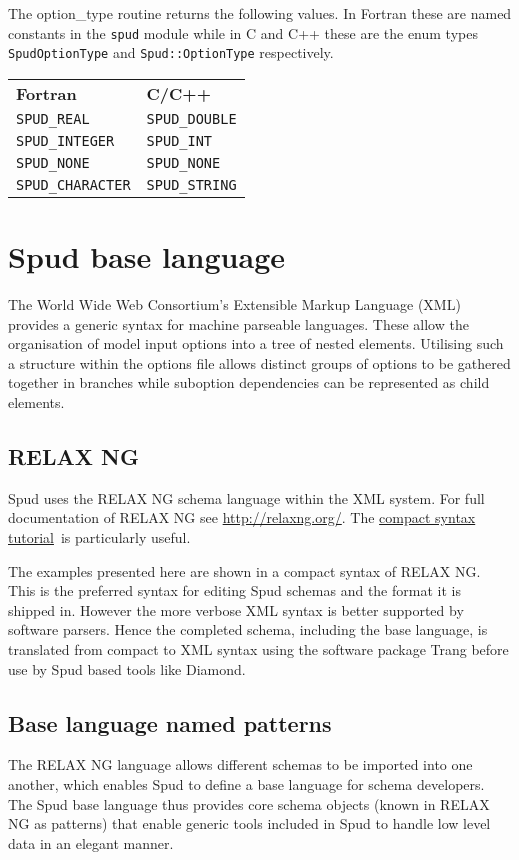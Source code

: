\documentclass[a4paper, 11pt]{book}
\begin{document}
The option\_type routine returns the following values. In Fortran these are
named constants in the \lstinline+spud+ module while in C and C++ these are
the enum types \lstinline+SpudOptionType+ and \lstinline+Spud::OptionType+
respectively. 

\begin{tabular}{ll}
  \textbf{Fortran} & \textbf{C/C++} \\
  \lstinline+SPUD_REAL+ & \lstinline+SPUD_DOUBLE+\\
  \lstinline+SPUD_INTEGER+ & \lstinline+SPUD_INT+\\
  \lstinline+SPUD_NONE+ & \lstinline+SPUD_NONE+\\
  \lstinline+SPUD_CHARACTER+ & \lstinline+SPUD_STRING+
\end{tabular}

\chapter{Spud base language}
\lstset{language=rnc}

The World Wide Web Consortium's Extensible Markup Language (XML) provides a
generic syntax for machine parseable languages.  These allow the
organisation of model input options into a tree of nested elements.
Utilising such a structure within the options file allows distinct groups of
options to be gathered together in branches while suboption dependencies can
be represented as child elements.

\section{RELAX NG}

Spud uses the RELAX NG schema language within the XML system. For full
documentation of RELAX NG see \url{http://relaxng.org/}. The
\href{http://relaxng.org/compact-tutorial-20030326.html}{compact syntax
  tutorial}\ is particularly useful.

The examples presented here are shown in a compact syntax of RELAX NG.  This
is the preferred syntax for editing Spud schemas and the format it is
shipped in.  However the more verbose XML syntax is better supported by
software parsers.  Hence the completed schema, including the base language,
is translated from compact to XML syntax using the software package Trang
before use by Spud based tools like Diamond.


\section{Base language named patterns}
The RELAX NG language allows different schemas to be imported into one
another, which enables Spud to define a base language for schema developers.
The Spud base language thus provides core schema objects (known in RELAX NG
as patterns) that enable generic tools included in Spud to handle low level
data in an elegant manner.
\end{document}
